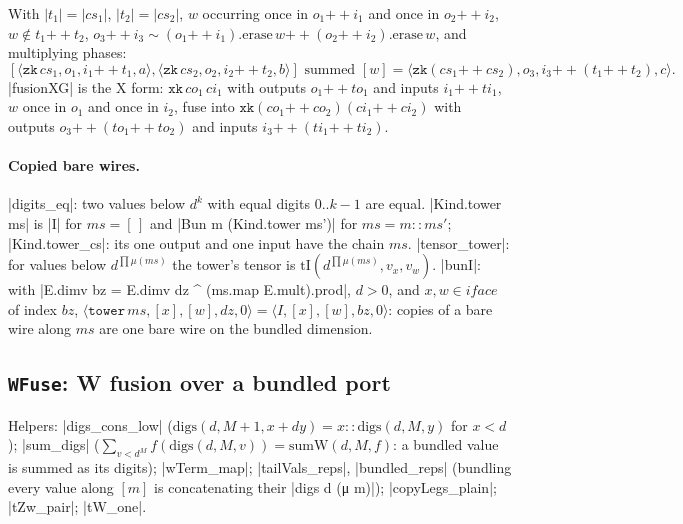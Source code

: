 \begin{lemma}
With $|t_1|=|cs_1|$, $|t_2|=|cs_2|$, $w$ occurring once in $o_1\mathbin{+\!\!+}i_1$ and once in
$o_2\mathbin{+\!\!+}i_2$, $w\notin t_1\mathbin{+\!\!+}t_2$, $o_3\mathbin{+\!\!+}i_3\sim(o_1\mathbin{+\!\!+}i_1).\mathrm{erase}\,w\mathbin{+\!\!+}
(o_2\mathbin{+\!\!+}i_2).\mathrm{erase}\,w$, and multiplying phases:
\[[\langle\mathtt{zk}\,cs_1,o_1,i_1\mathbin{+\!\!+}t_1,a\rangle,\langle\mathtt{zk}\,cs_2,o_2,i_2\mathbin{+\!\!+}t_2,b\rangle]
\text{ summed }[w]=\langle\mathtt{zk}(cs_1\mathbin{+\!\!+}cs_2),o_3,i_3\mathbin{+\!\!+}(t_1\mathbin{+\!\!+}t_2),c\rangle.\]
\lean|fusionXG| is the X form: $\mathtt{xk}\,co_1\,ci_1$ with outputs $o_1\mathbin{+\!\!+}to_1$ and inputs
$i_1\mathbin{+\!\!+}ti_1$, $w$ once in $o_1$ and once in $i_2$, fuse into
$\mathtt{xk}(co_1\mathbin{+\!\!+}co_2)(ci_1\mathbin{+\!\!+}ci_2)$ with outputs $o_3\mathbin{+\!\!+}(to_1\mathbin{+\!\!+}to_2)$ and inputs
$i_3\mathbin{+\!\!+}(ti_1\mathbin{+\!\!+}ti_2)$.
\end{lemma}

\paragraph{Copied bare wires.} \lean|digits_eq|: two values below $d^k$ with equal digits $0..k-1$ are
equal. \lean|Kind.tower ms| is \lean|I| for $ms=[\,]$ and \lean|Bun m (Kind.tower ms')| for
$ms=m{::}ms'$; \lean|Kind.tower_cs|: its one output and one input have the chain $ms$.
\lean|tensor_tower|: for values below $d^{\prod\mu(ms)}$ the tower's tensor is
$\mathrm{tI}(d^{\prod\mu(ms)},v_x,v_w)$. \lean|bunI|: with
\lean|E.dimv bz = E.dimv dz ^ (ms.map E.mult).prod|, $d>0$, and $x,w\in\mathit{iface}$ of index $bz$,
$\langle\mathtt{tower}\,ms,[x],[w],dz,0\rangle=\langle I,[x],[w],bz,0\rangle$: copies of a bare wire
along $ms$ are one bare wire on the bundled dimension.

\subsection{\texttt{WFuse}: W fusion over a bundled port}

Helpers: \lean|digs_cons_low| ($\mathrm{digs}(d,M{+}1,x+dy)=x{::}\mathrm{digs}(d,M,y)$ for $x<d$);
\lean|sum_digs| ($\sum_{v<d^M}f(\mathrm{digs}(d,M,v))=\mathrm{sumW}(d,M,f)$: a bundled value is
summed as its digits); \lean|wTerm_map|; \lean|tailVals_reps|, \lean|bundled_reps| (bundling every
value along $[m]$ is concatenating their \lean|digs d (μ m)|); \lean|copyLegs_plain|; \lean|tZw_pair|;
\lean|tW_one|.

